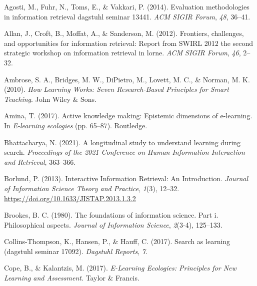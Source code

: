 \documentclass[a4paper, nobind]{templates/ociamthesis}
\newlength{\cslhangindent}
\newenvironment{CSLReferences}[2] %
 {%
  \setlength{\parindent}{0pt}
  \ifodd #1
  \let\oldpar\par
  \def\par{\hangindent=\cslhangindent\oldpar}
  \fi
  \setlength{\parskip}{1mm}
  \setlength{\baselineskip}{6mm}
 }%
 {}
\begin{document}
\hypertarget{refs}{}
\begin{CSLReferences}{1}{0}
\leavevmode{}%
Agosti, M., Fuhr, N., Toms, E., \& Vakkari, P. (2014). Evaluation methodologies in information retrieval dagstuhl seminar 13441. \emph{ACM SIGIR Forum}, \emph{48}, 36--41.

\leavevmode{}%
Allan, J., Croft, B., Moffat, A., \& Sanderson, M. (2012). Frontiers, challenges, and opportunities for information retrieval: Report from SWIRL 2012 the second strategic workshop on information retrieval in lorne. \emph{ACM SIGIR Forum}, \emph{46}, 2--32.

\leavevmode{}%
Ambrose, S. A., Bridges, M. W., DiPietro, M., Lovett, M. C., \& Norman, M. K. (2010). \emph{How {Learning Works}: Seven {Research}-{Based Principles} for {Smart Teaching}}. {John Wiley \& Sons}.

\leavevmode{}%
Amina, T. (2017). Active knowledge making: Epistemic dimensions of e-learning. In \emph{E-learning ecologies} (pp. 65--87). Routledge.

\leavevmode{}%
Bhattacharya, N. (2021). A longitudinal study to understand learning during search. \emph{Proceedings of the 2021 Conference on Human Information Interaction and Retrieval}, 363--366.

\leavevmode{}%
Borlund, P. (2013). Interactive {Information Retrieval}: {An Introduction}. \emph{Journal of Information Science Theory and Practice}, \emph{1}(3), 12--32. \url{https://doi.org/10.1633/JISTAP.2013.1.3.2}

\leavevmode{}%
Brookes, B. C. (1980). The foundations of information science. Part i. Philosophical aspects. \emph{Journal of Information Science}, \emph{2}(3-4), 125--133.

\leavevmode{}%
Collins-Thompson, K., Hansen, P., \& Hauff, C. (2017). Search as learning (dagstuhl seminar 17092). \emph{Dagstuhl Reports}, \emph{7}.

\leavevmode{}%
Cope, B., \& Kalantzis, M. (2017). \emph{E-{Learning Ecologies}: Principles for {New Learning} and {Assessment}}. {Taylor \& Francis}.


\end{CSLReferences}
\end{document}
